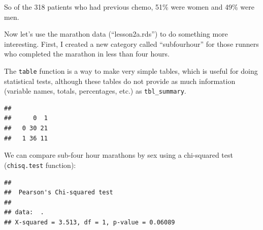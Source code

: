 \documentclass[]{book}
\newenvironment{Shaded}{\begin{snugshade}}{\end{snugshade}}
\newcommand{\CommentTok}[1]{\textcolor[rgb]{0.56,0.35,0.01}{\textit{#1}}}
\newcommand{\DataTypeTok}[1]{\textcolor[rgb]{0.13,0.29,0.53}{#1}}
\newcommand{\DecValTok}[1]{\textcolor[rgb]{0.00,0.00,0.81}{#1}}
\newcommand{\KeywordTok}[1]{\textcolor[rgb]{0.13,0.29,0.53}{\textbf{#1}}}
\newcommand{\NormalTok}[1]{#1}
\newcommand{\OperatorTok}[1]{\textcolor[rgb]{0.81,0.36,0.00}{\textbf{#1}}}
\newcommand{\OtherTok}[1]{\textcolor[rgb]{0.56,0.35,0.01}{#1}}
\newcommand{\StringTok}[1]{\textcolor[rgb]{0.31,0.60,0.02}{#1}}
\begin{document}
So of the 318 patients who had previous chemo, 51\% were women and 49\%
were men.

Now let's use the marathon data (``lesson2a.rds'') to do something more
interesting. First, I created a new category called ``subfourhour'' for
those runners who completed the marathon in less than four hours.

\begin{Shaded}
\end{Shaded}

The \texttt{table} function is a way to make very simple tables, which
is useful for doing statistical tests, although these tables do not
provide as much information (variable names, totals, percentages, etc.)
as \texttt{tbl\_summary}.

\begin{Shaded}
\end{Shaded}

\begin{verbatim}
##    
##      0  1
##   0 30 21
##   1 36 11
\end{verbatim}

We can compare sub-four hour marathons by sex using a chi-squared test
(\texttt{chisq.test} function):

\begin{Shaded}
\end{Shaded}

\begin{verbatim}
## 
##  Pearson's Chi-squared test
## 
## data:  .
## X-squared = 3.513, df = 1, p-value = 0.06089
\end{verbatim}
\end{document}
